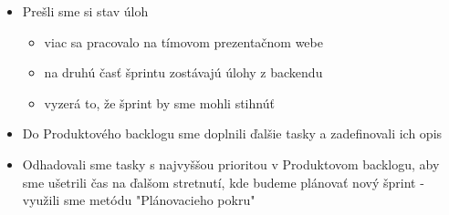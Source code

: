 \documentclass{article}
\begin{document}
    \begin{itemize}
        \item Prešli sme si stav úloh
        \begin{itemize}
            \item viac sa pracovalo na tímovom prezentačnom webe
            \item na druhú časť šprintu zostávajú úlohy z backendu
            \item vyzerá to, že šprint by sme mohli stihnúť
        \end{itemize}
        \item Do Produktového backlogu sme doplnili ďalšie tasky a zadefinovali ich opis
        \item Odhadovali sme tasky s najvyššou prioritou v Produktovom backlogu, aby sme ušetrili čas na ďalšom stretnutí, kde budeme plánovať nový šprint - využili sme metódu "Plánovacieho pokru"
    \end{itemize}


    
\end{document}
